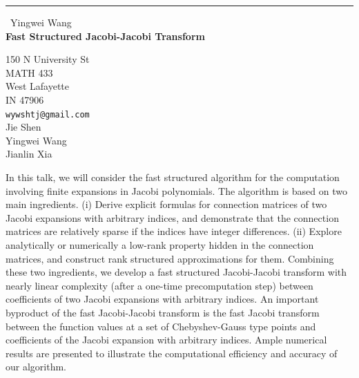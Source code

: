 \documentclass{report}
\begin{document}
\begin{center}
\rule{6in}{1pt} \
{\large Yingwei Wang \\
{\bf Fast Structured Jacobi-Jacobi Transform}}

150 N University St \\ MATH 433 \\ West Lafayette \\ IN 47906
\\
{\tt wywshtj@gmail.com}\\
Jie Shen\\
Yingwei Wang\\
Jianlin Xia\end{center}

In this talk, we will consider the fast structured algorithm for the
computation involving finite expansions in Jacobi polynomials.
The algorithm is based on two main ingredients.
(i) Derive explicit formulas for connection matrices of two Jacobi expansions
with arbitrary indices, and demonstrate that the connection matrices
are relatively sparse if the indices have integer differences.
(ii) Explore analytically or numerically a low-rank property hidden
in the connection matrices, and construct rank structured approximations for them.
Combining these two ingredients, we develop a fast structured
Jacobi-Jacobi transform with nearly linear complexity
(after a one-time precomputation step)
between coefficients of two Jacobi expansions with arbitrary indices.
An important byproduct of the fast Jacobi-Jacobi transform
is the fast Jacobi transform between the function values
at a set of Chebyshev-Gauss type points and coefficients
of the Jacobi expansion with arbitrary indices.
Ample numerical results are presented to illustrate
the computational efficiency and accuracy of our algorithm.
\end{document}

